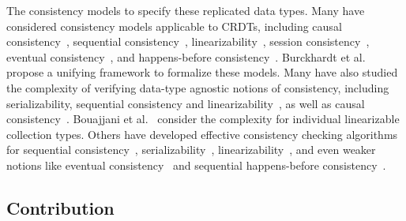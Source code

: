 The consistency models to specify these replicated data types.
Many have considered consistency models applicable to CRDTs, including causal consistency~\cite{DBLP:journals/cacm/Lamport78}, sequential consistency~\cite{DBLP:journals/tc/Lamport79}, linearizability~\cite{DBLP:journals/toplas/HerlihyW90}, session consistency~\cite{DBLP:conf/pdis/TerryDPSTW94}, eventual consistency~\cite{DBLP:conf/sosp/TerryTPDSH95}, and happens-before consistency~\cite{DBLP:conf/popl/MansonPA05}. Burckhardt et al.~\cite{DBLP:journals/ftpl/Burckhardt14, DBLP:conf/popl/BurckhardtGYZ14} propose a unifying framework to formalize these models. Many have also studied the complexity of verifying data-type agnostic notions of consistency, including serializability, sequential consistency and linearizability~\cite{DBLP:journals/jacm/Papadimitriou79b, DBLP:journals/siamcomp/GibbonsK97, DBLP:journals/iandc/AlurMP00, DBLP:conf/spaa/BinghamCH03, DBLP:conf/cav/FarzanM08, DBLP:conf/esop/BouajjaniEEH13, DBLP:conf/netys/Hamza15}, as well as causal consistency~\cite{DBLP:conf/popl/BouajjaniEGH17}.
Bouajjani et al.~\cite{DBLP:journals/iandc/BouajjaniEEH18, DBLP:journals/pacmpl/EmmiE18} consider the complexity for individual linearizable collection types. Others have developed effective consistency checking algorithms for sequential consistency~\cite{DBLP:conf/cav/HenzingerQR99a, DBLP:journals/tpds/Qadeer03, DBLP:conf/cav/BinghamCHQZ04, DBLP:conf/pldi/BurckhardtAM07}, serializability~\cite{DBLP:conf/fmcad/0002OPTZ07, DBLP:conf/cav/FarzanM08, DBLP:conf/pldi/GuerraouiHJS08, DBLP:conf/pldi/EmmiMM10}, linearizability~\cite{DBLP:journals/jpdc/WingG93, DBLP:conf/pldi/BurckhardtDMT10, DBLP:conf/pldi/EmmiEH15, DBLP:journals/concurrency/Lowe17}, and even weaker notions like eventual consistency~\cite{DBLP:conf/popl/BouajjaniEH14} and sequential happens-before consistency~\cite{DBLP:conf/cav/EmmiE18, DBLP:journals/pacmpl/EmmiE19}.


\subsection{Contribution}

